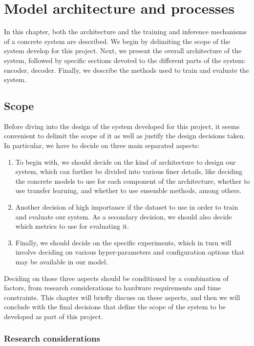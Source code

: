 \chapter{Model architecture and processes}
\label{ch:design}

In this chapter, both the architecture and the training and inference mechanisms of a concrete system are described. We begin by delimiting the scope of the system develop for this project. Next, we present the overall architecture of the system, followed by specific sections devoted to the different parts of the system: encoder, decoder. Finally, we describe the methods used to train and evaluate the system.

\section{Scope}\label{sec:scope}

Before diving into the design of the system developed for this project, it seems convenient to delimit the scope of it as well as justify the design decisions taken. In particular, we have to decide on three main separated aspects:

\begin{enumerate}
\item To begin with, we should decide on the kind of architecture to design our system, which can further be divided into various finer details, like deciding the concrete models to use for each component of the architecture, whether to use transfer learning, and whether to use ensemble methods, among others.
\item Another decision of high importance if the dataset to use in order to train and evaluate our system. As a secondary decision, we should also decide which metrics to use for evaluating it.
\item Finally, we should decide on the specific experiments, which in turn will involve deciding on various hyper-parameters and configuration options that may be available in our model.
\end{enumerate}

Deciding on those three aspects should be conditioned by a combination of factors, from research considerations to hardware requirements and time constraints. This chapter will briefly discuss on these aspects, and then we will conclude with the final decisions that define the scope of the system to be developed as part of this project.

\subsection{Research considerations}

